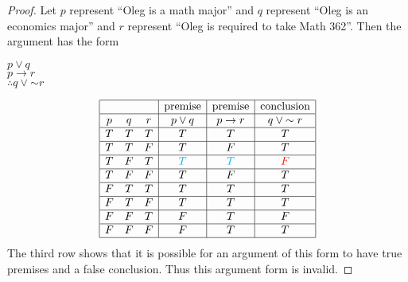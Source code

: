 \documentclass[14pt]{extarticle}
\begin{document}
\begin{proof}
    Let $p$ represent “Oleg is a math major” and $q$ represent “Oleg is an economics major” and $r$ represent ``Oleg is required to take Math 362''. Then the argument has the form

    \begin{center}
        $p \vee q$ \\ $p \to r$ \\ $\therefore q \vee {\sim r}$ \\
    \end{center}

    $$
        \begin{array}{|ccc|c|c|c|} \hline &   &   & \text{premise} & \text{premise} &
             \text{conclusion}                                                                \\
             \hline
             p                    & q & r & p \vee q       & p \to r        & q \vee {\sim r} \\
             \hline
             T                    & T & T & T              & T              & T               \\
             \hline
             T                    & T & F & T              & F              & T               \\
             \hline
             T                    & F & T & \color{cyan}T  & \color{cyan}T  & \color{red}F    \\
             \hline
             T                    & F & F & T              & F              & T               \\
             \hline
             F                    & T & T & T              & T              & T               \\
             \hline
             F                    & T & F & T              & T              & T               \\
             \hline
             F                    & F & T & F              & T              & F               \\
             \hline
             F                    & F & F & F              & T              & T               \\
             \hline
        \end{array}
    $$
    The third row shows that it is possible for an argument of this form to have true premises and a false conclusion. Thus this argument form is invalid.
\end{proof}
\end{document}
